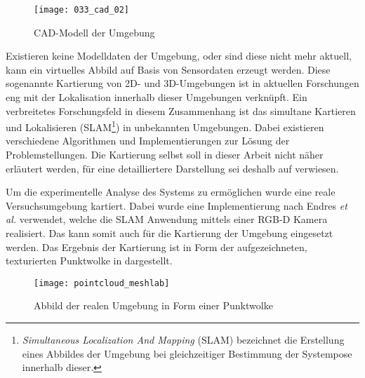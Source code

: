 
\begin{figure}[ht]
	\begin{center}
		\texttt{[image: 033\_cad\_02]}
		\caption{CAD-Modell der Umgebung}
		\label{fig.mapMod}
	\end{center}
\end{figure}

Existieren keine Modelldaten der Umgebung, oder sind diese nicht mehr aktuell, kann ein virtuelles Abbild auf Basis von Sensordaten erzeugt werden. Diese sogenannte Kartierung von 2D- und 3D-Umgebungen ist in aktuellen Forschungen eng mit der Lokalisation innerhalb dieser Umgebungen verknüpft. Ein verbreitetes Forschungsfeld in diesem Zusammenhang ist das simultane Kartieren und Lokalisieren (SLAM\footnote{\textit{Simultaneous Localization And Mapping} (SLAM) bezeichnet die Erstellung eines Abbildes der Umgebung bei gleichzeitiger Bestimmung der Systempose innerhalb dieser.}) in unbekannten Umgebungen. Dabei existieren verschiedene Algorithmen und Implementierungen zur Lösung der Problemstellungen. Die Kartierung selbst soll in dieser Arbeit nicht näher erläutert werden, für eine detailliertere Darstellung sei deshalb auf \cite{Durrant2006} verwiesen.\\


Um die experimentelle Analyse des Systems zu ermöglichen wurde eine reale Versuchsumgebung kartiert. Dabei wurde eine Implementierung \cite{Rgbdslam} nach Endres \textit{et al.} \cite{Endres2014} verwendet, welche die SLAM Anwendung mittels einer RGB-D Kamera realisiert. Das \kps{} kann somit auch für die Kartierung der Umgebung eingesetzt werden. Das Ergebnis der Kartierung ist in Form der aufgezeichneten, texturierten Punktwolke in  dargestellt.\\

\begin{figure}[ht]
	\begin{center}
		\texttt{[image: pointcloud\_meshlab]}
		\caption{Abbild der realen Umgebung in Form einer Punktwolke}
		\label{fig.mapSLAM}
	\end{center}
\end{figure}


